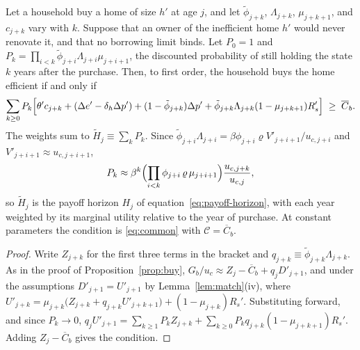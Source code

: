 \begin{lemma}\label{lem:horizon}
Let a household buy a home of size $h'$ at age $j$, and let
$\tilde\phi_{j+k}$, $\Lambda_{j+k}$, $\mu_{j+k+1}$, and $c_{j+k}$ vary with
$k$. Suppose that an owner of the inefficient home $h'$ would never
renovate it, and that no borrowing limit binds. Let $P_0=1$ and
$P_k=\prod_{i<k}\tilde\phi_{j+i}\Lambda_{j+i}\mu_{j+i+1}$, the discounted
probability of still holding the state $k$ years after the purchase. Then,
to first order, the household buys the home efficient if and only if
\begin{equation*}
  \sum_{k\ge0}P_k\Bigl[\theta'c_{j+k}+(\Delta e'-\delta_h\Delta p')
  +(1-\tilde\phi_{j+k})\Delta p'
  +\tilde\phi_{j+k}\Lambda_{j+k}(1-\mu_{j+k+1})R_s'\Bigr]
  \;\ge\;\overline C_b.
\end{equation*}
The weights sum to $\widetilde H_j\equiv\sum_kP_k$. Since
$\tilde\phi_{j+i}\Lambda_{j+i}=\beta\phi_{j+i}\varrho V'_{j+i+1}/u_{c,j+i}$
and $V'_{j+i+1}\approx u_{c,j+i+1}$,
\begin{equation*}
  P_k\approx\beta^k\Bigl(\prod_{i<k}\phi_{j+i}\,\varrho\,\mu_{j+i+1}\Bigr)
  \frac{u_{c,j+k}}{u_{c,j}},
\end{equation*}
so $\widetilde H_j$ is the payoff horizon $H_j$ of
equation~\eqref{eq:payoff-horizon}, with each year weighted by its marginal
utility relative to the year of purchase. At constant parameters the
condition is \eqref{eq:common} with $\mathcal C=\overline C_b$.
\end{lemma}

\begin{proof}
Write $Z_{j+k}$ for the first three terms in the bracket and
$q_{j+k}\equiv\tilde\phi_{j+k}\Lambda_{j+k}$. As in the proof of
Proposition~\ref{prop:buy}, $G_b/u_c\approx Z_j-\overline C_b+q_jD'_{j+1}$,
and under the assumptions $D'_{j+1}=U'_{j+1}$ by
Lemma~\ref{lem:match}(iv), where
$U'_{j+k}=\mu_{j+k}\bigl(Z_{j+k}+q_{j+k}U'_{j+k+1}\bigr)+(1-\mu_{j+k})R_s'$.
Substituting forward, and since $P_k\to0$,
$q_jU'_{j+1}=\sum_{k\ge1}P_kZ_{j+k}+\sum_{k\ge0}P_kq_{j+k}(1-\mu_{j+k+1})R_s'$.
Adding $Z_j-\overline C_b$ gives the condition.
\end{proof}

